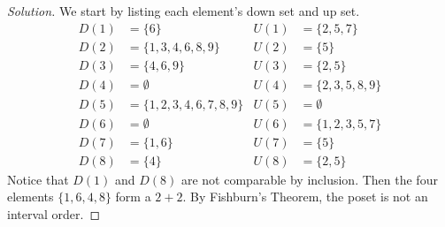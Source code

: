 \documentclass[12pt]{article}
\theoremstyle{definition}
\newenvironment{solution}{
  \begin{proof}[Solution]
    \vspace{-8px}
    \setlength{\parskip}{4px}
    \setlength{\parindent}{0px}
}{
\end{proof}
}
\begin{document}
  \begin{solution}
    We start by listing each element's down set and up set.
    \begin{align*}
      D \left( 1 \right) &= \{6\} & U \left( 1 \right) &= \{2, 5, 7\} \\
      D \left( 2 \right) &= \{1, 3, 4, 6, 8, 9\} & U \left( 2 \right) &= \{5\} \\
      D \left( 3 \right) &= \{4, 6, 9\} & U \left( 3 \right) &= \{2, 5\} \\
      D \left( 4 \right) &= \emptyset & U \left( 4 \right) &= \{2, 3, 5, 8, 9\} \\
      D \left( 5 \right) &= \{1, 2, 3, 4, 6, 7, 8, 9\} & U \left( 5 \right) &= \emptyset \\
      D \left( 6 \right) &= \emptyset & U \left( 6 \right) &= \{1, 2, 3, 5, 7\} \\
      D \left( 7 \right) &= \{1, 6\} & U \left( 7 \right) &= \{5\} \\
      D \left( 8 \right) &= \{4\} & U \left( 8 \right) &= \{2, 5\}
    \end{align*}
    Notice that \(D \left( 1 \right)\) and \(D \left( 8 \right)\) are not comparable by inclusion.
    Then the four elements \(\{1, 6, 4, 8\}\) form a \(2 + 2\).
    By Fishburn's Theorem, the poset is not an interval order.
  \end{solution}
\end{document}

